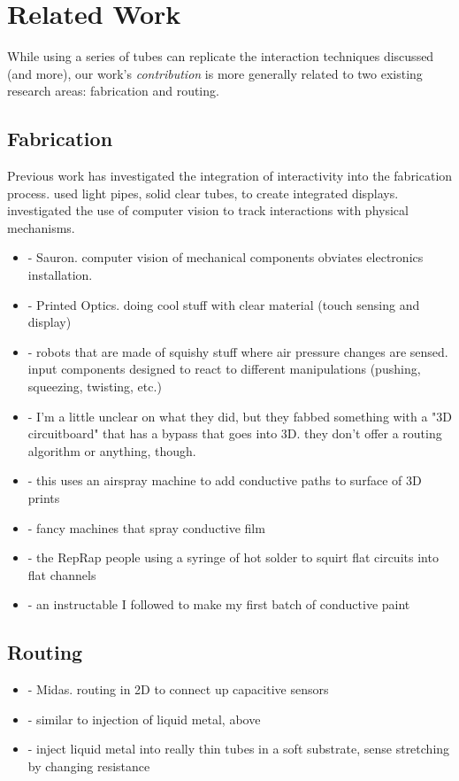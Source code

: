\section{Related Work}

While using a series of tubes can replicate the interaction techniques discussed (and more), our work's \emph{contribution} is more generally related to two existing research areas: fabrication and routing.

\subsection{Fabrication}

Previous work has investigated the integration of interactivity into the fabrication process.  \cite{Willis-printedoptics} used light pipes, solid clear tubes, to create integrated displays.  \cite{Savage-sauron} investigated the use of computer vision to track interactions with physical mechanisms.
\begin{itemize}
\item \cite{Savage-sauron} - Sauron.  computer vision of mechanical components obviates electronics installation.
\item \cite{Willis-printedoptics} - Printed Optics.  doing cool stuff with clear material (touch sensing and display)
\item \cite{Slyper-pressure} - robots that are made of squishy stuff where air pressure changes are sensed.  input components designed to react to different manipulations (pushing, squeezing, twisting, etc.)
\item \cite{Navarrette-gps} - I'm a little unclear on what they did, but they fabbed something with a "3D circuitboard" that has a bypass that goes into 3D.  they don't offer a routing algorithm or anything, though.
\item \cite{Sarik-tracebrush} - this uses an airspray machine to add conductive paths to surface of 3D prints
\item \cite{Optomec} - fancy machines that spray conductive film
\item \cite{Sells-reprap} - the RepRap people using a syringe of hot solder to squirt flat circuits into flat channels
\item \cite{icecats-conductivepaint} - an instructable I followed to make my first batch of conductive paint
\end{itemize}

\subsection{Routing}
\begin{itemize}
\item \cite{Savage-midas} - Midas.  routing in 2D to connect up capacitive sensors
\item \cite{Park-microchannels} - similar to injection of liquid metal, above
\item \cite{Majidi-curvature} - inject liquid metal into really thin tubes in a soft substrate, sense stretching by changing resistance
\end{itemize}

